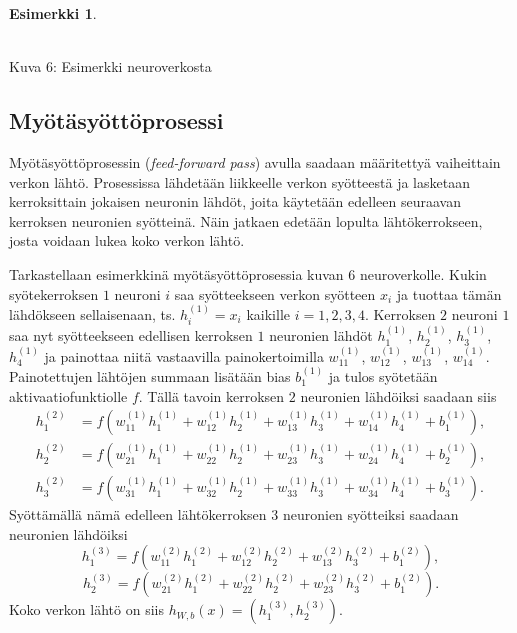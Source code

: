 \documentclass[12pt,a4paper,finnish,oneside,titlepage]{article}
\theoremstyle{plain}
\theoremstyle{definition}
\newtheorem{esim}[lause]{Esimerkki}    %
\theoremstyle{remark}
\begin{document}
\begin{esim}
\begin{center}
\vspace{0.1in}
\\Kuva 6: Esimerkki neuroverkosta
\end{center}
\end{esim}

\subsection{Myötäsyöttöprosessi}
Myötäsyöttöprosessin (\textit{feed-forward pass}) avulla saadaan määritettyä vaiheittain verkon lähtö. Prosessissa lähdetään liikkeelle verkon syötteestä ja lasketaan kerroksittain jokaisen neuronin lähdöt, joita käytetään edelleen seuraavan kerroksen neuronien syötteinä. Näin jatkaen edetään lopulta lähtökerrokseen, josta voidaan lukea koko verkon lähtö.

Tarkastellaan esimerkkinä myötäsyöttöprosessia kuvan 6 neuroverkolle. Kukin syötekerroksen \(1\) neuroni \(i\) saa syötteekseen verkon syötteen \(x_i\) ja tuottaa tämän lähdökseen sellaisenaan, ts. \(h_i^{(1)}=x_i\) kaikille \(i=1, 2, 3, 4\). Kerroksen \(2\) neuroni \(1\) saa nyt syötteekseen edellisen kerroksen \(1\) neuronien lähdöt \(h_1^{(1)}\), \(h_2^{(1)}\), \(h_3^{(1)}\), \(h_4^{(1)}\) ja painottaa niitä vastaavilla painokertoimilla \(w_{11}^{(1)}\), \(w_{12}^{(1)}\), \(w_{13}^{(1)}\), \(w_{14}^{(1)}\). Painotettujen lähtöjen summaan lisätään bias \(b_1^{(1)}\) ja tulos syötetään aktivaatiofunktiolle \(f\). Tällä tavoin kerroksen \(2\) neuronien lähdöiksi saadaan siis 
\[\begin{align*}
    h_1^{(2)}&=f\left(w_{11}^{(1)} h_1^{(1)} + w_{12}^{(1)} h_2^{(1)} + w_{13}^{(1)} h_3^{(1)} + w_{14}^{(1)} h_4^{(1)} +b_1^{(1)}\right), \\
    h_2^{(2)}&=f\left(w_{21}^{(1)} h_1^{(1)} + w_{22}^{(1)} h_2^{(1)} + w_{23}^{(1)} h_3^{(1)}+w_{24}^{(1)} h_4^{(1)}+b_2^{(1)}\right), \\
    h_3^{(2)}&=f\left(w_{31}^{(1)} h_1^{(1)} + w_{32}^{(1)} h_2^{(1)} + w_{33}^{(1)} h_3^{(1)}+w_{34}^{(1)}h_4^{(1)}+b_3^{(1)}\right).
\end{align*}\]
Syöttämällä nämä edelleen lähtökerroksen \(3\) neuronien syötteiksi saadaan neuronien lähdöiksi
\[h_1^{(3)}=f\left (w_{11}^{(2)} h_1^{(2)}+w_{12}^{(2)} h_2^{(2)}+w_{13}^{(2)} h_3^{(2)}+b_1^{(2)}\right),\]
\[h_2^{(3)}=f\left (w_{21}^{(2)} h_1^{(2)}+w_{22}^{(2)} h_2^{(2)}+w_{23}^{(2)} h_3^{(2)}+b_1^{(2)}\right).\]
Koko verkon lähtö on siis \(h_{W,b}(x)=(h_1^{(3)}, h_2^{(3)})\).
\end{document}
